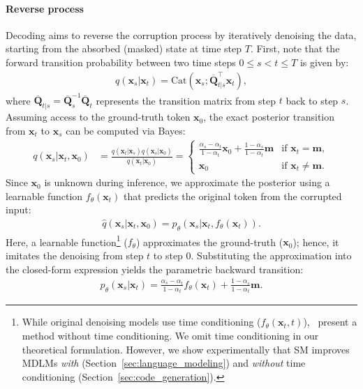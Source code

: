 \documentclass{article}
\begin{document}
\paragraph{Reverse process}
Decoding aims to reverse the corruption process by iteratively denoising the data, starting from the absorbed (masked) state at time step $T$.
% 
First, note that the forward transition probability between two time steps $0 \leq  s < t \leq T$ is given by:
\begin{align*}
    q(\mathbf{x}_s | \mathbf{x}_t) = \text{Cat}(\mathbf{x}_s; \overline{\mathbf{Q}}^\top_{t|s}\mathbf{x}_t), 
\end{align*}
where $\overline{\mathbf{Q}}_{t|s} = \overline{\mathbf{Q}}_s^{-1} \overline{\mathbf{Q}}_t$ represents the transition matrix from step $t$ back to step $s$.
% 
Assuming access to the ground-truth token $\mathbf{x}_0$, the exact posterior transition from $\mathbf{x}_t$ to $\mathbf{x}_s$ can be computed via Bayes: 
\begin{align*}
    q(\mathbf{x}_s | \mathbf{x}_t, \mathbf{x}_0) &= \frac{q(\mathbf{x}_t | \mathbf{x}_s) q(\mathbf{x}_s | \mathbf{x}_0)}{q(\mathbf{x}_t | \mathbf{x}_0)} = 
\begin{cases}
\frac{\alpha_s - \alpha_t}{1 - \alpha_t} \mathbf{x}_0 + \frac{1 - \alpha_s}{1 - \alpha_t} \mathbf{m} & \text{if } \mathbf{x}_t = \mathbf{m}, \\
\mathbf{x}_0 & \text{if } \mathbf{x}_t \neq \mathbf{m}.
\end{cases}
\end{align*}
Since $\mathbf{x}_0$ is unknown during inference, we approximate the posterior using a learnable function $f_\theta(\mathbf{x}_t)$ that predicts the original token from the corrupted input: 
\begin{align*}
    \hat{q}(\mathbf{x}_s | \mathbf{x}_t, \mathbf{x}_0) = p_\theta (\mathbf{x}_s | \mathbf{x}_t, f_\theta(\mathbf{x}_t)). 
\end{align*}
% 
Here, a learnable function\footnote{While original denoising models use time conditioning ($f_\theta (\mathbf{x}_t, t)$),~\cite{ou_your_2024} present a method without time conditioning. We omit time conditioning in our theoretical formulation. However, we show experimentally that SM improves MDLMs \emph{with} (Section~\ref{sec:language_modeling}) and \emph{without} time conditioning (Section~\ref{sec:code_generation}).}
($f_\theta$) approximates the ground-truth ($\mathbf{x}_0$); hence, it imitates the denoising from step $t$ to step $0$. 
% 
Substituting the approximation into the closed-form expression yields the parametric backward transition:
\begin{align}
  p_\theta(\mathbf{x}_s | \mathbf{x}_t) =   \frac{\alpha_s - \alpha_t}{1 - \alpha_t} f_\theta (\mathbf{x}_t) + \frac{1 - \alpha_s}{1 - \alpha_t} \mathbf{m}.  \label{eq:diff_decoding}
\end{align}
\end{document}
